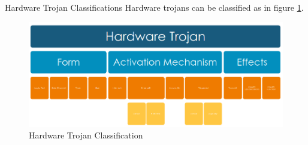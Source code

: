 \begin{section}{Hardware Trojan Classifications}
  Hardware trojans can be classified as in figure \ref{fig:hw-trojan-classification}.
  \begin{figure}[H]
    \centering
    \includegraphics[width=\textwidth]{img/hardware/hw trojan classification.png}
    \caption{Hardware Trojan Classification}
    \label{fig:hw-trojan-classification}
  \end{figure}
\end{section}

